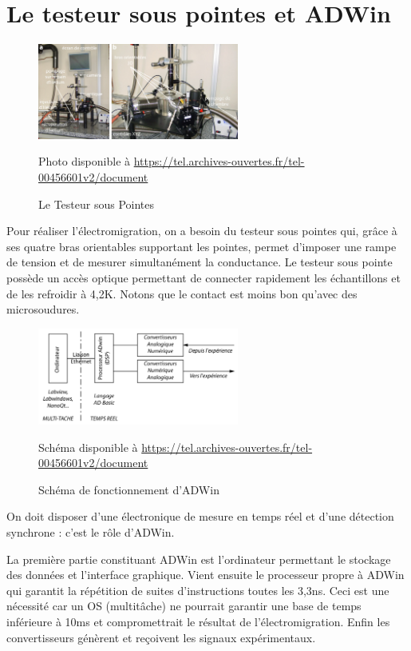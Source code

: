 \section{Le testeur sous pointes et ADWin}
\begin{figure}[h]
    \begin{center}
        \includegraphics[width=250px]{Images/ADWin_avec_legendes}
        \caption{Le Testeur sous Pointes}
        \label{fig:}
        Photo disponible à \url{https://tel.archives-ouvertes.fr/tel-00456601v2/document}
    \end{center}
\end{figure}
Pour réaliser l'électromigration, on a besoin du testeur sous pointes qui, grâce à ses quatre bras orientables supportant les pointes, permet d'imposer une rampe de tension et de mesurer simultanément la conductance. Le testeur sous pointe possède un accès optique permettant de connecter rapidement les échantillons et de les refroidir à 4,2K. Notons que le contact est moins bon qu'avec des microsoudures. 
\begin{figure}[h]
    \begin{center}
        \includegraphics[width=250px]{Images/ADWin_schema}
        \caption{Schéma de fonctionnement d'ADWin}
        \label{fig:}
        Schéma disponible à \url{https://tel.archives-ouvertes.fr/tel-00456601v2/document}
    \end{center}
\end{figure}

On doit disposer d'une électronique de mesure en temps réel et d'une détection synchrone : c'est le rôle d'ADWin.

La première partie constituant ADWin est l'ordinateur permettant le stockage des données et l'interface graphique. Vient ensuite le processeur propre à ADWin qui garantit la répétition de suites d'instructions toutes les 3,3ns. Ceci est une nécessité car un OS (multitâche) ne pourrait garantir une base de temps inférieure à 10ms et compromettrait le résultat de l'électromigration. Enfin les convertisseurs génèrent et reçoivent les signaux expérimentaux.

